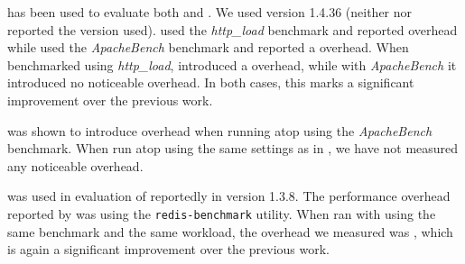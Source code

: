 \boldtext{\lighttpd} %
has been used to evaluate both \mx and \tachyon.  We used version
1.4.36 (neither \mx nor \tachyon reported the version used). \mx used
the \emph{http\_load} benchmark and reported \mxLighttpd overhead
while \tachyon used the \emph{ApacheBench} benchmark and reported a
\tachyonLighttpd overhead.  When benchmarked using \emph{http\_load},
\varan introduced a \lighttpdHttploadOneFollower overhead, while with
\emph{ApacheBench} it introduced no noticeable
overhead. %
In both
cases, this marks a significant improvement over the previous work.

\boldtext{\thttpd} %
was shown to introduce \tachyonThttpd overhead when running atop \tachyon using
the \emph{ApacheBench} benchmark. When run atop \nx using the same settings
as in \cite{tachyon12}, we have not measured any noticeable overhead.

\boldtext{\redis} %
was used in evaluation of \mx reportedly in version 1.3.8.  The performance
overhead reported by \mx was \mxRedis using the \lstinline`redis-benchmark`
utility. When ran with \nx using the same benchmark and the same workload,
the overhead we measured was \redisOneFollower, which is again a significant
improvement over the previous work.



